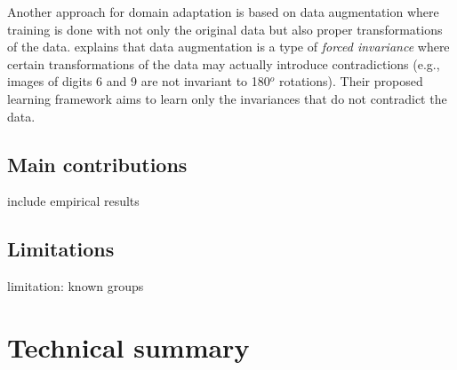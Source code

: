 Another approach for domain adaptation is based on data augmentation \parencite{Chen:2020} where training is done with not only the original data but also proper transformations of the data. \textcite{Mouli:2021} explains that data augmentation is a type of \textit{forced invariance} where certain transformations of the data may actually introduce contradictions (e.g., images of digits 6 and 9 are not invariant to 180$^o$ rotations). Their proposed learning framework aims to learn only the invariances that do not contradict the data.

\subsection{Main contributions}
\todo include empirical results
 
\subsection{Limitations}

\todo
limitation: known groups


\newpage


\section{Technical summary}